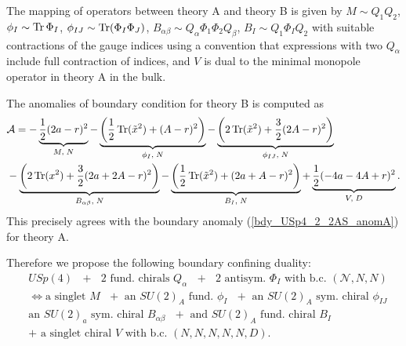 \documentclass[12pt]{article}
\newcommand{\Acal}{\mathcal{A}}
\DeclareMathOperator*{\Tr}{{\rm Tr}}
\numberwithin{equation}{section}
\begin{document}
The mapping of operators between theory A and theory B is given by
$M \sim Q_1 Q_2$, $\phi_I \sim \Tr \Phi_I$, $\phi_{IJ} \sim \Tr(\Phi_I \Phi_J)$, $B_{\alpha \beta} \sim Q_{\alpha} \Phi_1 \Phi_2 Q_{\beta}$, $B_I \sim Q_1 \Phi_I  Q_2$ with suitable contractions of the gauge indices using a convention that expressions with two $Q_{\alpha}$ include full contraction of indices, and $V$ is dual to the minimal monopole operator in theory A in the bulk.

The anomalies of boundary condition for theory B is computed as
\begin{align}
\label{bdy_USp4_2_2AS_anom}
&\Acal = - \underbrace{\frac{1}{2}(2a-r)^2}_{M, \; N}
  - \underbrace{\left( \frac{1}{2}\Tr(\tilde{x}^2) + (A-r)^2 \right)}_{\phi_I, \; N}
  - \underbrace{\left( 2\Tr(\tilde{x}^2) + \frac{3}{2}(2A-r)^2 \right)}_{\phi_{IJ}, \; N}
  \nonumber \\
  & - \underbrace{\left( 2\Tr(x^2) + \frac{3}{2}(2a+2A-r)^2 \right)}_{B_{\alpha \beta}, \; N}
  - \underbrace{\left( \frac{1}{2}\Tr(\tilde{x}^2) + (2a+A-r)^2 \right)}_{B_I, \; N}
   + \underbrace{\frac{1}{2}(-4a-4A+r)^2}_{V, \; D}. 
\end{align}
This precisely agrees with the boundary anomaly (\ref{bdy_USp4_2_2AS_anomA}) for theory A. 

Therefore we propose the following boundary confining duality: 
\begin{align}
\label{bcdual_USp4_2_2AS}
&\textrm{$USp(4)$ $+$ $2$ fund. chirals $Q_{\alpha}$ $+$ $2$ antisym. $\Phi_I$ with b.c. $(\mathcal{N},N,N)$}
\nonumber\\
&\Leftrightarrow 
\textrm{
a singlet $M$ $+$ an $SU(2)_A$ fund. $\phi_I$ $+$ 
an $SU(2)_A$ sym. chiral $\phi_{IJ}$}
\nonumber\\
&\textrm{an $SU(2)_a$ sym. chiral $B_{\alpha\beta}$ $+$ and $SU(2)_A$ fund. chiral $B_I$}
\nonumber\\
&\textrm{$+$ a singlet chiral $V$ with b.c. $(N,N,N,N,N,D)$}. 
\end{align}
\end{document}
